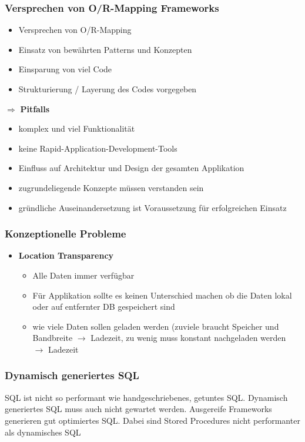 \documentclass{report}
\theoremstyle{definition}
\theoremstyle{example}
\begin{document}
\subsubsection{Versprechen von O/R-Mapping Frameworks}
\begin{itemize}
	\item Versprechen von O/R-Mapping
	\item Einsatz von bewährten Patterns und Konzepten
	\item Einsparung von viel Code
	\item Strukturierung / Layerung des Codes vorgegeben
\end{itemize}

$\Rightarrow$ \textbf{Pitfalls}\\
\begin{itemize}
	\item komplex und viel Funktionalität
	\item keine Rapid-Application-Development-Tools
	\item Einfluss auf Architektur und Design der gesamten Applikation
	\item zugrundeliegende Konzepte müssen verstanden sein
	\item gründliche Auseinandersetzung ist Voraussetzung für erfolgreichen Einsatz
\end{itemize}

\subsubsection{Konzeptionelle Probleme}
\begin{itemize}
	\item {\textbf{Location Transparency}
		\begin{itemize}
			\item Alle Daten immer verfügbar
			\item Für Applikation sollte es keinen Unterschied machen ob die Daten lokal oder auf entfernter DB gespeichert sind
			\item wie viele Daten sollen geladen werden (zuviele braucht Speicher und Bandbreite $\rightarrow$ Ladezeit, zu wenig muss konstant nachgeladen werden $\rightarrow$ Ladezeit
		\end{itemize}
	}
\end{itemize}

\subsubsection{Dynamisch generiertes SQL}
SQL ist nicht so performant wie handgeschriebenes, getuntes SQL. Dynamisch generiertes SQL muss auch nicht gewartet werden. Ausgereife Frameworks generieren gut optimiertes SQL. Dabei sind Stored Procedures nicht performanter als dynamisches SQL
\end{document}
